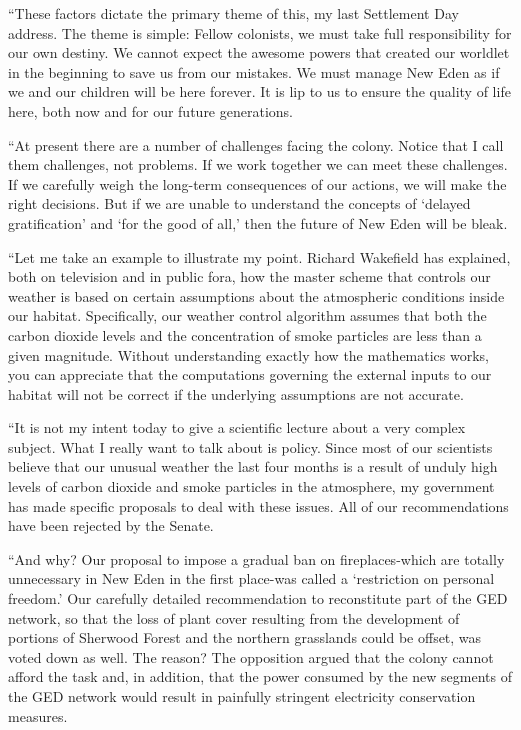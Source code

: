\documentclass[]{article}
\begin{document}
{“These factors dictate the primary theme of this, my last Settlement Day address.  The theme is simple: Fellow colonists, we must take full responsibility for our own destiny.  We cannot expect the awesome powers that created our worldlet in the beginning to save us from our mistakes.  We must manage New Eden as if we and our children will be here forever.  It is lip to us to ensure the quality of life here, both now and for our future generations.

“At present there are a number of challenges facing the colony.  Notice that I call them challenges, not problems.  If we work together we can meet these challenges.  If we carefully weigh the long-term consequences of our actions, we will make the right decisions.  But if we are unable to understand the concepts of ‘delayed gratification’ and ‘for the good of all,’ then the future of New Eden will be bleak.

“Let me take an example to illustrate my point.  Richard Wakefield has explained, both on television and in public fora, how the master scheme that controls our weather is based on certain assumptions about the atmospheric conditions inside our habitat.  Specifically, our weather control algorithm assumes that both the carbon dioxide levels and the concentration of smoke particles are less than a given magnitude.  Without understanding exactly how the mathematics works, you can appreciate that the computations governing the external inputs to our habitat will not be correct if the underlying assumptions are not accurate.

“It is not my intent today to give a scientific lecture about a very complex subject.  What I really want to talk about is policy.  Since most of our scientists believe that our unusual weather the last four months is a result of unduly high levels of carbon dioxide and smoke particles in the atmosphere, my government has made specific proposals to deal with these issues.  All of our recommendations have been rejected by the Senate.

“And why? Our proposal to impose a gradual ban on fireplaces-which are totally unnecessary in New Eden in the first place-was called a ‘restriction on personal freedom.’ Our carefully detailed recommendation to reconstitute part of the GED network, so that the loss of plant cover resulting from the development of portions of Sherwood Forest and the northern grasslands could be offset, was voted down as well.  The reason? The opposition argued that the colony cannot afford the task and, in addition, that the power consumed by the new segments of the GED network would result in painfully stringent electricity conservation measures.

}
\end{document}
